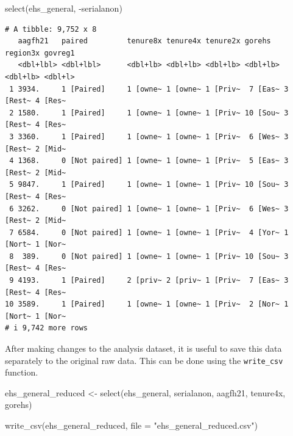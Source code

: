 \documentclass[
  letterpaper,
  DIV=11,
  numbers=noendperiod]{scrreprt}
\newenvironment{Shaded}{\begin{snugshade}}{\end{snugshade}}
\newcommand{\AttributeTok}[1]{\textcolor[rgb]{0.40,0.45,0.13}{#1}}
\newcommand{\FunctionTok}[1]{\textcolor[rgb]{0.28,0.35,0.67}{#1}}
\newcommand{\NormalTok}[1]{\textcolor[rgb]{0.00,0.23,0.31}{#1}}
\newcommand{\OtherTok}[1]{\textcolor[rgb]{0.00,0.23,0.31}{#1}}
\newcommand{\SpecialCharTok}[1]{\textcolor[rgb]{0.37,0.37,0.37}{#1}}
\newcommand{\StringTok}[1]{\textcolor[rgb]{0.13,0.47,0.30}{#1}}
\begin{document}
\begin{Shaded}
\begin{Highlighting}[]
\FunctionTok{select}\NormalTok{(ehs\_general, }\SpecialCharTok{{-}}\NormalTok{serialanon)}
\end{Highlighting}
\end{Shaded}

\begin{verbatim}
# A tibble: 9,752 x 8
   aagfh21   paired         tenure8x tenure4x tenure2x gorehs   region3x govreg1
   <dbl+lbl> <dbl+lbl>      <dbl+lb> <dbl+lb> <dbl+lb> <dbl+lb> <dbl+lb> <dbl+l>
 1 3934.     1 [Paired]     1 [owne~ 1 [owne~ 1 [Priv~  7 [Eas~ 3 [Rest~ 4 [Res~
 2 1580.     1 [Paired]     1 [owne~ 1 [owne~ 1 [Priv~ 10 [Sou~ 3 [Rest~ 4 [Res~
 3 3360.     1 [Paired]     1 [owne~ 1 [owne~ 1 [Priv~  6 [Wes~ 3 [Rest~ 2 [Mid~
 4 1368.     0 [Not paired] 1 [owne~ 1 [owne~ 1 [Priv~  5 [Eas~ 3 [Rest~ 2 [Mid~
 5 9847.     1 [Paired]     1 [owne~ 1 [owne~ 1 [Priv~ 10 [Sou~ 3 [Rest~ 4 [Res~
 6 3262.     0 [Not paired] 1 [owne~ 1 [owne~ 1 [Priv~  6 [Wes~ 3 [Rest~ 2 [Mid~
 7 6584.     0 [Not paired] 1 [owne~ 1 [owne~ 1 [Priv~  4 [Yor~ 1 [Nort~ 1 [Nor~
 8  389.     0 [Not paired] 1 [owne~ 1 [owne~ 1 [Priv~ 10 [Sou~ 3 [Rest~ 4 [Res~
 9 4193.     1 [Paired]     2 [priv~ 2 [priv~ 1 [Priv~  7 [Eas~ 3 [Rest~ 4 [Res~
10 3589.     1 [Paired]     1 [owne~ 1 [owne~ 1 [Priv~  2 [Nor~ 1 [Nort~ 1 [Nor~
# i 9,742 more rows
\end{verbatim}

After making changes to the analysis dataset, it is useful to save this
data separately to the original raw data. This can be done using the
\texttt{write\_csv} function.

\begin{Shaded}
\begin{Highlighting}[]
\NormalTok{ehs\_general\_reduced }\OtherTok{\textless{}{-}} \FunctionTok{select}\NormalTok{(ehs\_general, serialanon, aagfh21, tenure4x, gorehs)}
\end{Highlighting}
\end{Shaded}

\begin{Shaded}
\begin{Highlighting}[]
\FunctionTok{write\_csv}\NormalTok{(ehs\_general\_reduced, }\AttributeTok{file =} \StringTok{"ehs\_general\_reduced.csv"}\NormalTok{)}
\end{Highlighting}
\end{Shaded}
\end{document}
